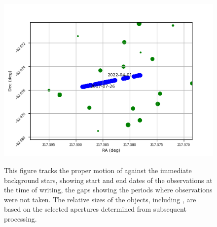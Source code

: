 \begin{figure}[!htbp]
\begin{center}
\includegraphics[scale=0.7]{images/pmprox.png} \\
\end{center}
\caption{This figure tracks the proper motion of {\prox} against the immediate
background stars, showing start and end dates of the observations at the time
of writing, the gaps showing the periods where observations were not taken.
The relative sizes of the objects, including \prox, are based on the selected
apertures determined from subsequent processing.} \protect\label{fig:proxpm}
\end{figure}

